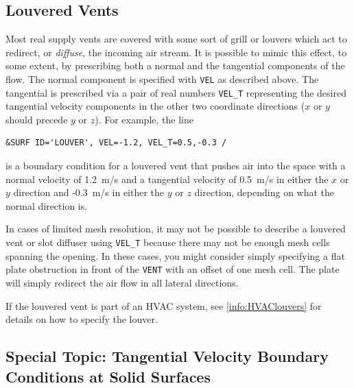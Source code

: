 \documentclass[11pt]{book}
\newcommand{\ct}{\tt\small}
\begin{document}
\subsection{Louvered Vents}

\label{info:louvers}

Most real supply vents are covered with some sort of grill or louvers which act to redirect, or {\em diffuse}, the
incoming air stream.
It is possible to mimic this effect, to some extent, by prescribing both a normal and the tangential components of the flow.
The normal component is specified with {\ct VEL} as described above. The tangential is prescribed
via a pair of real numbers {\ct VEL\_T} representing the desired tangential
velocity components in the other two coordinate directions ($x$ or $y$ should precede $y$ or $z$). For example, the line

\footnotesize
\begin{verbatim}
&SURF ID='LOUVER', VEL=-1.2, VEL_T=0.5,-0.3 /
\end{verbatim}
\normalsize

\noindent
is a boundary condition for a louvered vent that pushes air into the
space with a normal velocity of 1.2~m/s and a tangential velocity
of 0.5~m/s in either the $x$ or $y$ direction and -0.3~m/s in either
the $y$ or $z$ direction, depending on what the normal direction is.

In cases of limited mesh resolution, it may not be possible to describe a louvered vent or
slot diffuser using {\ct VEL\_T} because there may not be enough mesh cells spanning the
opening. In these cases, you might consider simply specifying a flat plate obstruction in front of the
{\ct VENT} with an offset of one mesh cell. The plate will simply redirect the air flow in all lateral
directions.

If the louvered vent is part of an HVAC system, see \ref{info:HVAClouvers} for details on how to specify the louver.

\subsection{Special Topic: Tangential Velocity Boundary Conditions at Solid Surfaces}
\label{info:WALL_MODEL}
\end{document}
